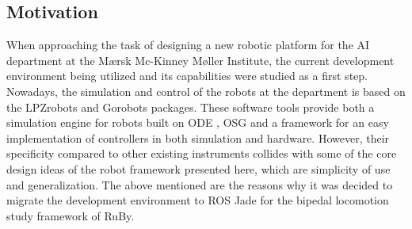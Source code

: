 
\subsection{Motivation} %
\label{sub:motivation}
When approaching the task of designing a new robotic platform for the AI department at the Mærsk Mc-Kinney Møller Institute, the current development environment being utilized and its capabilities were studied as a first step.
Nowadays, the simulation and control of the robots at the department is based on the LPZrobots \cite{lpzrobots} and Gorobots \cite{gorobots} packages.
These software tools provide both a simulation engine for robots built on ODE \cite{ode}, OSG \cite{osg} and a framework for an easy implementation of controllers in both simulation and hardware.
However, their specificity compared to other existing instruments collides with some of the core design ideas of the robot framework presented here, which are simplicity of use and generalization.
The above mentioned are the reasons why it was decided to migrate the development environment to ROS Jade \cite{ros} for the bipedal locomotion study framework of RuBy. 

